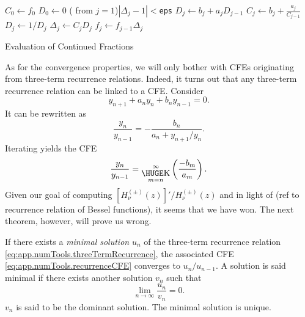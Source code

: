   \begin{algorithm}
   $C_0 \leftarrow f_0$\;
   $D_0 \leftarrow 0$\;
   \Repeat( from $j=1$){$|\Delta_j-1|<$\texttt{eps}}%
   {
    $D_j \leftarrow b_j+a_jD_{j-1}$\;
    $C_j \leftarrow b_j+\frac{a_j}{C_{j-1}}$\;
    $D_j \leftarrow 1/D_j$\;
    $\Delta_j\leftarrow C_jD_j$\;
    $f_j \leftarrow f_{j-1}\Delta_j$
   }
  \caption{Evaluation of Continued Fractions}
  \label{algo:app.numTools.cfeEvaluation}
  \end{algorithm}

As for the convergence properties, we will only bother with CFEs 
originating from three-term recurrence relations. Indeed, it turns out
that any three-term recurrence relation can be linked to a CFE. 
Consider  
  \begin{equation}
    \label{eq:app.numTools.threeTermRecurrence}
   y_{n+1} + a_ny_n + b_ny_{n-1} = 0. 
  \end{equation}
It can be rewritten as
  \begin{equation}
    \frac{y_n}{y_{n-1}} = -\frac{b_n}{a_n+y_{n+1}/y_n}.
  \end{equation}
Iterating yields the CFE
  \begin{equation}
   \label{eq:app.numTools.recurrenceCFE}
   \frac{y_n}{y_{n-1}} = \bigk_{m=n}^\infty\left(\frac{-b_m}{a_m}\right).
  \end{equation}
Given our goal of computing $[H^{(\pm)}_\nu(z)]'/H^{(\pm)}_\nu(z)$
and in light of (ref to recurrence relation of Bessel functions), it seems that
we have won. The next theorem, however, will prove us wrong.
   \begin{thm}
    If there exists a \textit{minimal solution} $u_n$ of the three-term
    recurrence relation \eqref{eq:app.numTools.threeTermRecurrence}, 
    the associated CFE \eqref{eq:app.numTools.recurrenceCFE} converges
    to $u_n/u_{n-1}$. A solution is said minimal if there exists another
    solution $v_n$ such that
      \begin{equation}
       \lim_{n\rightarrow\infty} \frac{u_n}{v_n} = 0.
      \end{equation}
    $v_n$ is said to be the dominant solution. The minimal solution is unique. 
   \end{thm}

